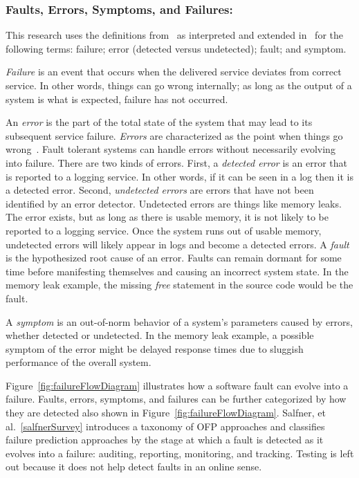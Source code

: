 \subsubsection{Faults, Errors, Symptoms, and Failures:}
This research uses the definitions from~\cite{avivzienis2004basic} as
interpreted and extended in~\cite{salfnerSurvey} for the following terms:
failure; error (detected versus undetected); fault; and symptom.

\emph{Failure} is an event that occurs when the delivered service deviates from
correct service.  In other words, things can go wrong internally; as long as
the output of a system is what is expected, failure has not occurred.  

An \emph{error} is the part of the total state of the system that may lead to
its subsequent service failure.  \emph{Errors} are characterized as the point
when things go wrong~\cite{salfnerSurvey}.  Fault tolerant systems can handle
errors without necessarily evolving into failure.  There are two kinds of
errors.  First, a \emph{detected error} is an error that is reported to a
logging service.  In other words, if it can be seen in a log then it is a
detected error.  Second, \emph{undetected errors} are errors that have not been
identified by an error detector.  Undetected errors are things like memory
leaks.  The error exists, but as long as there is usable memory, it is not
likely to be reported to a logging service.  Once the system runs out of usable
memory, undetected errors will likely appear in logs and become a detected
errors.  A \emph{fault} is the hypothesized root cause of an error.  Faults can
remain dormant for some time before manifesting themselves and causing an
incorrect system state.  In the memory leak example, the missing \emph{free}
statement in the source code would be the fault.  

A \emph{symptom} is an out-of-norm behavior of a system's parameters caused by
errors, whether detected or undetected.  In the memory leak example, a possible
symptom of the error might be delayed response times due to sluggish
performance of the overall system.

\figfailureFlowDiagram

Figure~\ref{fig:failureFlowDiagram} illustrates how a software fault can evolve
into a failure.  Faults, errors, symptoms, and failures can be further
categorized by how they are detected also shown in
Figure~\ref{fig:failureFlowDiagram}.  Salfner, et al.~\ref{salfnerSurvey}
introduces a taxonomy of OFP approaches and classifies failure prediction
approaches by the stage at which a fault is detected as it evolves into a
failure: auditing, reporting, monitoring, and tracking.  Testing is left out
because it does not help detect faults in an online sense.  

